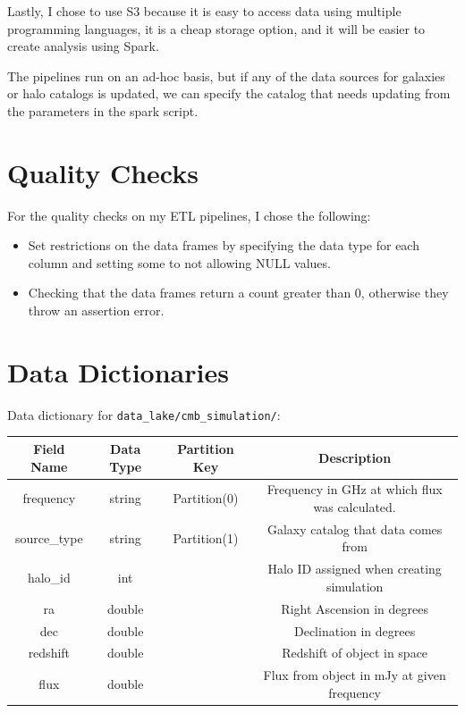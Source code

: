 \documentclass[12pt,letterpaper]{article}
\begin{document}
Lastly, I chose to use S3 because it is easy to access data using multiple
programming languages, it is a cheap storage option, and it will be easier to
create analysis using Spark.

The pipelines run on an ad-hoc basis, but if any of the data sources for
galaxies or halo catalogs is updated, we can specify the catalog that needs
updating from the parameters in the spark script.

\section*{Quality Checks}
For the quality checks on my ETL pipelines, I chose the following:
\begin{itemize}
    \item Set restrictions on the data frames by specifying the data type for
        each column and setting some to not allowing NULL values.
    \item Checking that the data frames return a count greater than 0,
        otherwise they throw an assertion error.
\end{itemize}

\section*{Data Dictionaries}

Data dictionary for \texttt{data\_lake/cmb\_simulation/}:
\begin{table}[h!]
    \centering
    \begin{tabular}{ |c|c|c|c| }
        \hline
        Field Name & Data Type & Partition Key & Description \\
        \hline
        frequency & string & Partition(0) & Frequency in GHz at which flux was calculated. \\
        source\_type & string & Partition(1) & Galaxy catalog that data comes from \\
        halo\_id & int & & Halo ID assigned when creating simulation \\
        ra & double & & Right Ascension in degrees \\
        dec & double & & Declination in degrees \\
        redshift & double & & Redshift of object in space \\
        flux & double & & Flux from object in mJy at given frequency \\
        \hline
    \end{tabular}
\end{table}
\end{document}
